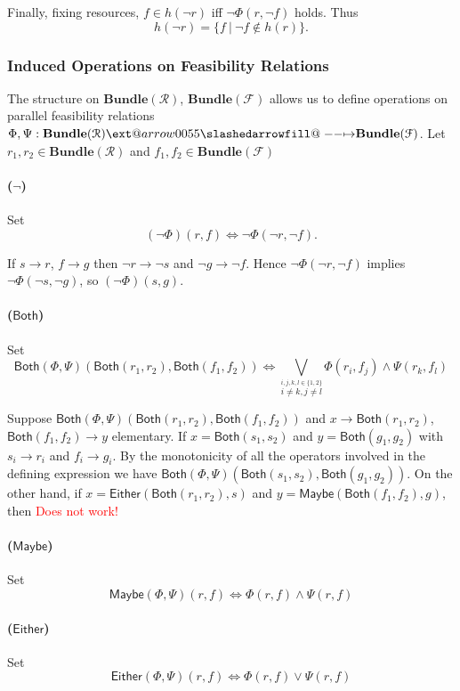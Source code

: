 \documentclass[12pt]{article}
\makeatletter
\theoremstyle{definition}
\theoremstyle{plain}
\theoremstyle{plain}
\theoremstyle{plain}
\theoremstyle{plain}
\theoremstyle{remark}
\theoremstyle{remark}
\newcommand{\mc}[1]{\mathcal{#1}}
\newcommand{\maybe}{\mathsf{Maybe}}
\newcommand{\either}{\mathsf{Either}}
\newcommand{\both}{\mathsf{Both}}
\def\slashedarrowfill@#1#2#3#4#5{%
	$\m@th\thickmuskip0mu\medmuskip\thickmuskip\thinmuskip\thickmuskip
	\relax#5#1\mkern-7mu%
	\cleaders\hbox{$#5\mkern-2mu#2\mkern-2mu$}\hfill
	\mathclap{#3}\mathclap{#2}%
	\cleaders\hbox{$#5\mkern-2mu#2\mkern-2mu$}\hfill
	\mkern-7mu#4$%
}
\def\rightslashedarrowfill@{%
	\slashedarrowfill@\relbar\relbar\mapstochar\rightarrow}
\newcommand\xslashedrightarrow[2][]{%
	\ext@arrow 0055{\rightslashedarrowfill@}{#1}{#2}}
\makeatother
\begin{document}
Finally, fixing resources,  $f \in h(\neg r)$ iff $\neg \Phi(r,\neg f)$ holds. Thus $$ h(\neg r) = \{f \:|\: \neg f \notin h(r)\}. $$

\subsubsection{Induced Operations on Feasibility Relations}

The structure on $\mathbf{Bundle}(\mc{R})$, $\mathbf{Bundle}(\mc{F})$ allows us to define operations on parallel feasibility relations  $\Phi, \Psi :\mathbf{Bundle}(\mc{R}) \xslashedrightarrow{} \mathbf{Bundle}(\mc{F})$. Let $r_1,r_2 \in \mathbf{Bundle}(\mc{R})$ and $f_1,f_2 \in \mathbf{Bundle}(\mc{F})$

\paragraph{($\neg$)} Set 
$$(\neg\Phi)(r,f) \Leftrightarrow \neg \Phi(\neg r, \neg f).$$ 

If $s \rightarrow r$, $f \rightarrow g$ then $\neg r \rightarrow \neg s$ and $\neg g \rightarrow \neg f$. Hence $\neg \Phi(\neg r, \neg f)$ implies $\neg \Phi(\neg s, \neg g)$, so $(\neg\Phi)(s,g) $.

\paragraph{($\both$)} Set 
$$\both(\Phi,\Psi)(\both(r_1,r_2),\both(f_1,f_2)) \Leftrightarrow \bigvee_{\stackrel{i,j,k,l \in \{1,2\}}{i \neq k, j \neq l}}\Phi(r_i,f_j) \wedge \Psi(r_k,f_l)$$

Suppose $\both(\Phi,\Psi)(\both(r_1,r_2),\both(f_1,f_2))$ and $x \rightarrow \both(r_1,r_2)$, $\both(f_1,f_2) \rightarrow y$ elementary. If $x =  \both(s_1,s_2)$ and $y = \both(g_1,g_2)$ with $s_i \rightarrow r_i$ and $f_i \rightarrow g_i$. By the monotonicity of all the operators involved in the defining expression we have $\both(\Phi,\Psi)(\both(s_1,s_2),\both(g_1,g_2))$. On the other hand, if $x = \either(\both(r_1,r_2),s)$ and $y = \maybe(\both(f_1,f_2),g)$, then \textcolor{red}{Does not work!}

\paragraph{($\maybe$)} Set
$$\maybe(\Phi,\Psi)(r, f)  \Leftrightarrow \Phi(r,f) \wedge \Psi(r,f)$$

\paragraph{($\either$)} Set
$$\either(\Phi,\Psi)(r, f)  \Leftrightarrow \Phi(r,f) \vee \Psi(r,f)$$
\end{document}

